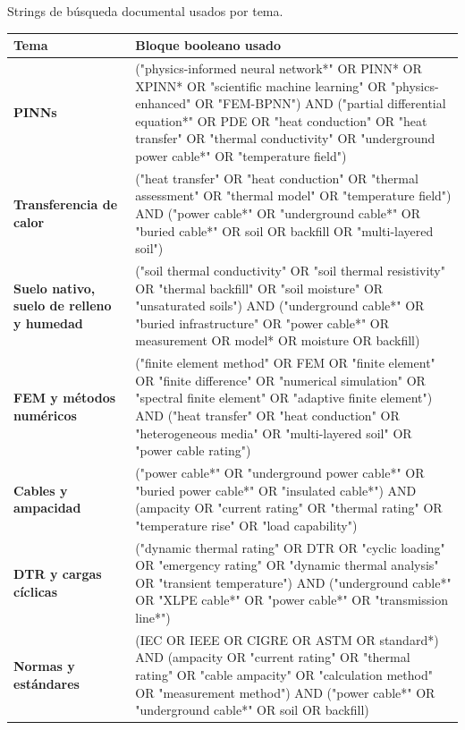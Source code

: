 \documentclass[11pt,a4paper,oneside]{report}
\renewcommand{\arraystretch}{1.18}
\begin{document}
\begin{singlespace}
\clearpage
\begin{landscape}
\thispagestyle{empty}
\begin{center}
\captionsetup{type=table,hypcap=false}
\caption{Strings de búsqueda documental usados por tema.}
\label{tab:strings-documentales}
\vspace{0.4em}
\footnotesize
\setlength{\tabcolsep}{5pt}
\renewcommand{\arraystretch}{1.22}
\begin{tabularx}{\linewidth}{>{\bfseries}L{4.1cm}>{\ttfamily\scriptsize\RaggedRight\arraybackslash}X}
\toprule
\normalfont\bfseries Tema & \normalfont\bfseries Bloque booleano usado \\
\midrule
PINNs & ("physics-informed neural network*" OR PINN* OR XPINN* OR "scientific machine learning" OR "physics-enhanced" OR "FEM-BPNN") AND ("partial differential equation*" OR PDE OR "heat conduction" OR "heat transfer" OR "thermal conductivity" OR "underground power cable*" OR "temperature field") \\
\addlinespace[0.35em]
Transferencia de calor & ("heat transfer" OR "heat conduction" OR "thermal assessment" OR "thermal model" OR "temperature field") AND ("power cable*" OR "underground cable*" OR "buried cable*" OR soil OR backfill OR "multi-layered soil") \\
\addlinespace[0.35em]
Suelo nativo, suelo de relleno y humedad & ("soil thermal conductivity" OR "soil thermal resistivity" OR "thermal backfill" OR "soil moisture" OR "unsaturated soils") AND ("underground cable*" OR "buried infrastructure" OR "power cable*" OR measurement OR model* OR moisture OR backfill) \\
\addlinespace[0.35em]
FEM y métodos numéricos & ("finite element method" OR FEM OR "finite element" OR "finite difference" OR "numerical simulation" OR "spectral finite element" OR "adaptive finite element") AND ("heat transfer" OR "heat conduction" OR "heterogeneous media" OR "multi-layered soil" OR "power cable rating") \\
\addlinespace[0.35em]
Cables y ampacidad & ("power cable*" OR "underground power cable*" OR "buried power cable*" OR "insulated cable*") AND (ampacity OR "current rating" OR "thermal rating" OR "temperature rise" OR "load capability") \\
\addlinespace[0.35em]
DTR y cargas cíclicas & ("dynamic thermal rating" OR DTR OR "cyclic loading" OR "emergency rating" OR "dynamic thermal analysis" OR "transient temperature") AND ("underground cable*" OR "XLPE cable*" OR "power cable*" OR "transmission line*") \\
\addlinespace[0.35em]
Normas y estándares & (IEC OR IEEE OR CIGRE OR ASTM OR standard*) AND (ampacity OR "current rating" OR "thermal rating" OR "cable ampacity" OR "calculation method" OR "measurement method") AND ("power cable*" OR "underground cable*" OR soil OR backfill) \\
\bottomrule
\end{tabularx}


\end{center}
\end{landscape}
\end{singlespace}
\end{document}
